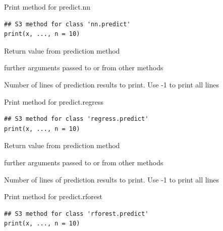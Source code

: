 \documentclass[a4paper]{book}
\begin{document}
%
\begin{Description}
Print method for predict.nn
\end{Description}
%
\begin{Usage}
\begin{verbatim}
## S3 method for class 'nn.predict'
print(x, ..., n = 10)
\end{verbatim}
\end{Usage}
%
\begin{Arguments}
\begin{ldescription}
\item[\code{x}] Return value from prediction method

\item[\code{...}] further arguments passed to or from other methods

\item[\code{n}] Number of lines of prediction results to print. Use -1 to print all lines
\end{ldescription}
\end{Arguments}
%
\begin{Description}
Print method for predict.regress
\end{Description}
%
\begin{Usage}
\begin{verbatim}
## S3 method for class 'regress.predict'
print(x, ..., n = 10)
\end{verbatim}
\end{Usage}
%
\begin{Arguments}
\begin{ldescription}
\item[\code{x}] Return value from prediction method

\item[\code{...}] further arguments passed to or from other methods

\item[\code{n}] Number of lines of prediction results to print. Use -1 to print all lines
\end{ldescription}
\end{Arguments}
%
\begin{Description}
Print method for predict.rforest
\end{Description}
%
\begin{Usage}
\begin{verbatim}
## S3 method for class 'rforest.predict'
print(x, ..., n = 10)
\end{verbatim}
\end{Usage}
\end{document}
